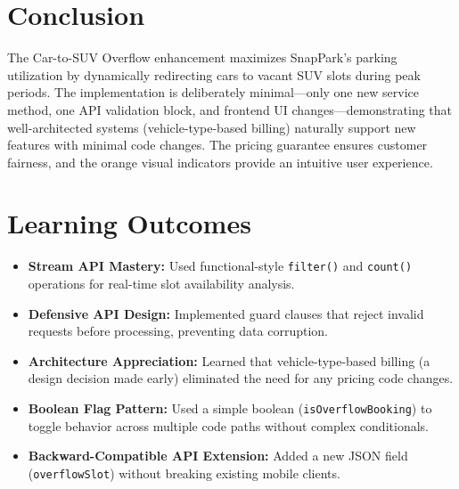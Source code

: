 \documentclass[12pt,a4paper]{article}
\begin{document}
\section{Conclusion}

The Car-to-SUV Overflow enhancement maximizes SnapPark's parking utilization by dynamically redirecting cars to vacant SUV slots during peak periods. The implementation is deliberately minimal---only one new service method, one API validation block, and frontend UI changes---demonstrating that well-architected systems (vehicle-type-based billing) naturally support new features with minimal code changes. The pricing guarantee ensures customer fairness, and the orange visual indicators provide an intuitive user experience.

\section{Learning Outcomes}

\begin{itemize}
    \item \textbf{Stream API Mastery:} Used functional-style \texttt{filter()} and \texttt{count()} operations for real-time slot availability analysis.
    \item \textbf{Defensive API Design:} Implemented guard clauses that reject invalid requests before processing, preventing data corruption.
    \item \textbf{Architecture Appreciation:} Learned that vehicle-type-based billing (a design decision made early) eliminated the need for any pricing code changes.
    \item \textbf{Boolean Flag Pattern:} Used a simple boolean (\texttt{isOverflowBooking}) to toggle behavior across multiple code paths without complex conditionals.
    \item \textbf{Backward-Compatible API Extension:} Added a new JSON field (\texttt{overflowSlot}) without breaking existing mobile clients.
\end{itemize}
\end{document}
